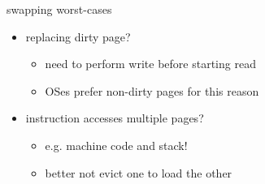 \begin{frame}[fragile,label=swapBadCase]{swapping worst-cases}
\begin{itemize}
    \item replacing dirty page?
        \begin{itemize}
        \item need to perform write before starting read
        \item OSes prefer non-dirty pages for this reason
        \end{itemize}
    \item instruction accesses multiple pages?
        \begin{itemize}
            \item e.g. machine code and stack!
            \item better not evict one to load the other
        \end{itemize}
\end{itemize}
\end{frame}
